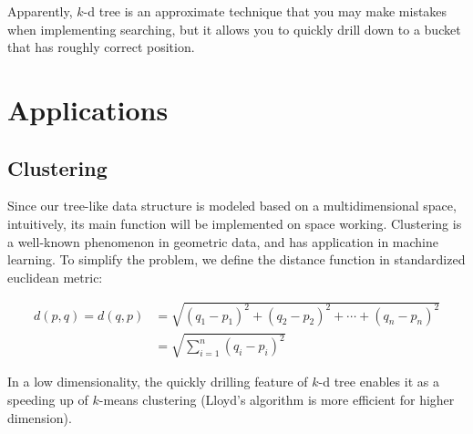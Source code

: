 \documentclass[12pt, a4paper]{article}
\begin{document}
\begin{figure}[ht]
\begin{floatrow}[1]
{
            }
        \end{floatrow}
    \end{figure}

    Apparently, $k$-d tree is an approximate technique that you may make mistakes when implementing searching, but it allows you to quickly drill down to a bucket that has roughly correct position.

    \section{Applications}

    \subsection{Clustering}
        Since our tree-like data structure is modeled based on a multidimensional space, intuitively, its main function will be implemented on space working. Clustering is a well-known phenomenon in geometric data, and has application in machine learning. To simplify the problem, we define the distance function in standardized euclidean metric:

        \begin{equation*}\begin{split}
            d(p,q)=d(q,p)&=\sqrt{(q_{1}-p_{1})^2+(q_{2}-p_{2})^2+\cdots+(q_{n}-p_{n})^2}\\
            &=\sqrt{\sum_{i=1}^{n}{(q_{i}-p_{i})^2}}
        \end{split}\end{equation*}

        In a low dimensionality, the quickly drilling feature of $k$-d tree enables it as a speeding up of $k$-means clustering \cite{DBLP:conf/sdm/Hamerly10} (Lloyd's algorithm is more efficient for higher dimension).
\end{document}
